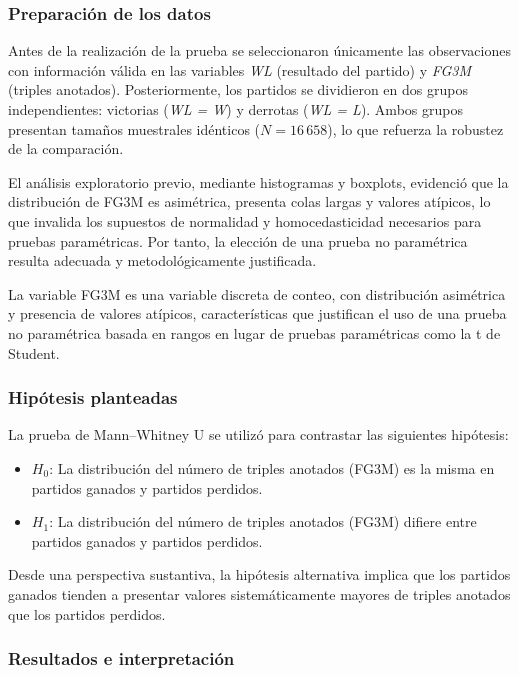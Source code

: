 \documentclass[12pt]{article}
\begin{document}
\subsubsection{Preparación de los datos}
Antes de la realización de la prueba se seleccionaron únicamente las observaciones con
información válida en las variables \textit{WL} (resultado del partido) y \textit{FG3M}
(triples anotados). Posteriormente, los partidos se dividieron en dos grupos independientes:
victorias (\textit{WL = W}) y derrotas (\textit{WL = L}). Ambos grupos presentan tamaños
muestrales idénticos ($N = 16\,658$), lo que refuerza la robustez de la comparación.

El análisis exploratorio previo, mediante histogramas y boxplots, evidenció que la
distribución de FG3M es asimétrica, presenta colas largas y valores atípicos, lo que
invalida los supuestos de normalidad y homocedasticidad necesarios para pruebas
paramétricas. Por tanto, la elección de una prueba no paramétrica resulta adecuada y
metodológicamente justificada.

La variable FG3M es una variable discreta de conteo, con distribución asimétrica y presencia
de valores atípicos, características que justifican el uso de una prueba no paramétrica
basada en rangos en lugar de pruebas paramétricas como la t de Student.

\subsubsection{Hipótesis planteadas}

La prueba de Mann--Whitney U se utilizó para contrastar las siguientes hipótesis:

\begin{itemize}
    \item $H_0$: La distribución del número de triples anotados (FG3M) es la misma en partidos
    ganados y partidos perdidos.
    \item $H_1$: La distribución del número de triples anotados (FG3M) difiere entre partidos
    ganados y partidos perdidos.
\end{itemize}

Desde una perspectiva sustantiva, la hipótesis alternativa implica que los partidos ganados
tienden a presentar valores sistemáticamente mayores de triples anotados que los partidos
perdidos.

\subsubsection{Resultados e interpretación}
\end{document}
